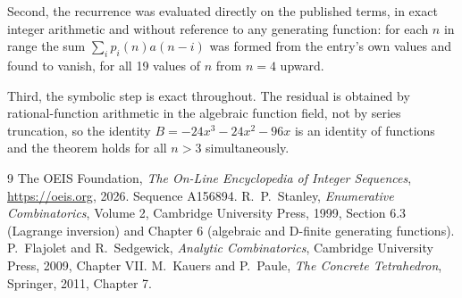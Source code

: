 \documentclass[11pt,a4paper]{article}
\theoremstyle{plain}
\theoremstyle{definition}
\begin{document}
Second, the recurrence was evaluated directly on the published terms, in exact integer
arithmetic and without reference to any generating function: for each $n$ in range the sum
$\sum_{i}p_{i}(n)a(n-i)$ was formed from the entry's own values and found to vanish, for
all 19 values of $n$ from $n=4$ upward.

Third, the symbolic step is exact throughout. The residual is obtained by
rational-function arithmetic in the algebraic function field, not by series truncation, so
the identity $B=- 24 x^{3} - 24 x^{2} - 96 x$ is an identity of functions and the theorem holds for all
$n>3$ simultaneously.

\begin{thebibliography}{9}
 The OEIS Foundation, \emph{The On-Line Encyclopedia of Integer Sequences},
\url{https://oeis.org}, 2026. Sequence A156894.
 R.~P.~Stanley, \emph{Enumerative Combinatorics}, Volume 2, Cambridge
University Press, 1999, Section 6.3 (Lagrange inversion) and Chapter 6 (algebraic and
D-finite generating functions).
 P.~Flajolet and R.~Sedgewick, \emph{Analytic Combinatorics}, Cambridge
University Press, 2009, Chapter VII.
 M.~Kauers and P.~Paule, \emph{The Concrete Tetrahedron}, Springer, 2011,
Chapter 7.
\end{thebibliography}
\end{document}
